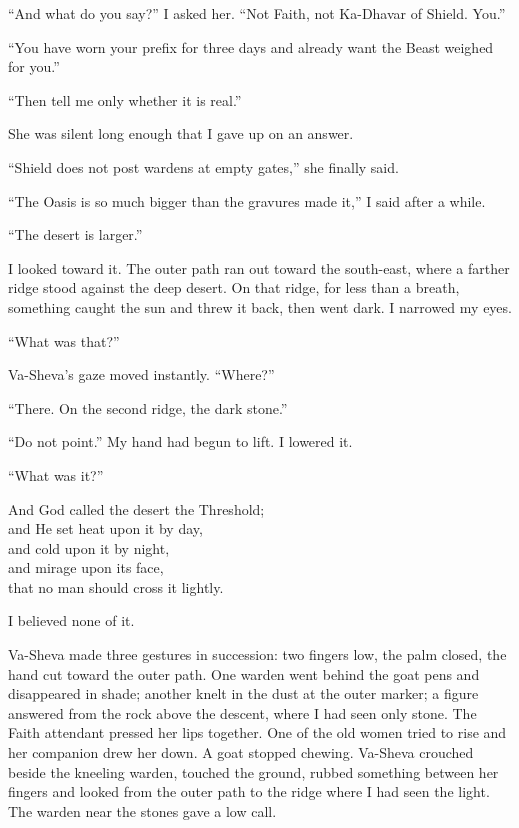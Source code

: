 ``And what do you say?'' I asked her. ``Not Faith, not Ka-Dhavar of Shield. You.''\par
``You have worn your prefix for three days and already want the Beast weighed for you.''\par
``Then tell me only whether it is real.''\par
She was silent long enough that I gave up on an answer.\par
``Shield does not post wardens at empty gates,'' she finally said.\par
``The Oasis is so much bigger than the gravures made it,'' I said after a while.\par
``The desert is larger.''\par

I looked toward it. The outer path ran out toward the south-east, where a farther ridge stood against the deep desert. On that ridge, for less than a breath, something caught the sun and threw it back, then went dark. I narrowed my eyes.\par

``What was that?''\par
Va-Sheva's gaze moved instantly. ``Where?''\par
``There. On the second ridge, the dark stone.''\par
``Do not point.'' 
My hand had begun to lift. I lowered it. \par
``What was it?''\par

\begin{scripture}
And God called the desert the Threshold; \\
and He set heat upon it by day, \\
and cold upon it by night, \\
and mirage upon its face, \\
that no man should cross it lightly.\par
\end{scripture}

I believed none of it.

\ornament

Va-Sheva made three gestures in succession: two fingers low, the palm closed, the hand cut toward the outer path. One warden went behind the goat pens and disappeared in shade; another knelt in the dust at the outer marker; a figure answered from the rock above the descent, where I had seen only stone. The Faith attendant pressed her lips together. One of the old women tried to rise and her companion drew her down. A goat stopped chewing. Va-Sheva crouched beside the kneeling warden, touched the ground, rubbed something between her fingers and looked from the outer path to the ridge where I had seen the light. The warden near the stones gave a low call.\par

